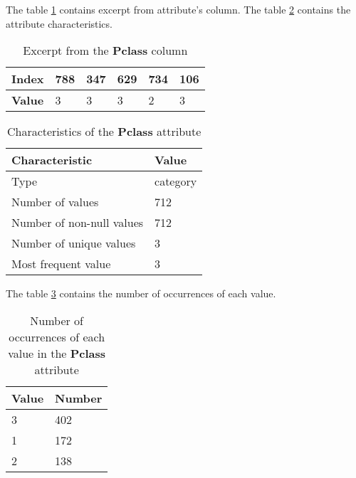 The table \ref{table:pclass_head} contains excerpt from attribute's column.
The table \ref{table:pclass_characteristics} contains the attribute 
characteristics.

\begin{table}[!hp]
    \centering
    \caption{Excerpt from the \textbf{Pclass} column}
    \begin{tabular}{|l|l|l|l|l|l|}
        \hline
        \textbf{Index} & 788 & 347 & 629 & 734 & 106 \\ \hline
        \textbf{Value} & 3   & 3   & 3   & 2   & 3   \\ \hline
    \end{tabular}
    \label{table:pclass_head}
\end{table}

\begin{table}[!hp]
    \centering
    \caption{Characteristics of the \textbf{Pclass} attribute}
    \begin{tabular}{|l|l|}
        \hline
        \textbf{Characteristic}   & \textbf{Value} \\ \hline
        Type                      & category       \\ \hline
        Number of values          & 712            \\ \hline
        Number of non-null values & 712            \\ \hline
        Number of unique values   & 3              \\ \hline
        Most frequent value       & 3              \\ \hline
    \end{tabular}
    \label{table:pclass_characteristics}
\end{table}

The table \ref{table:pclass_value_counts} contains the number of occurrences of
each value.

\begin{table}[!hp]
    \centering
    \caption{Number of occurrences of each value in the \textbf{Pclass} attribute}
    \begin{tabular}{|l|l|}
        \hline
        \textbf{Value} & \textbf{Number} \\ \hline
        3              & 402             \\ \hline
        1              & 172             \\ \hline
        2              & 138             \\ \hline
    \end{tabular}
    \label{table:pclass_value_counts}
\end{table}

